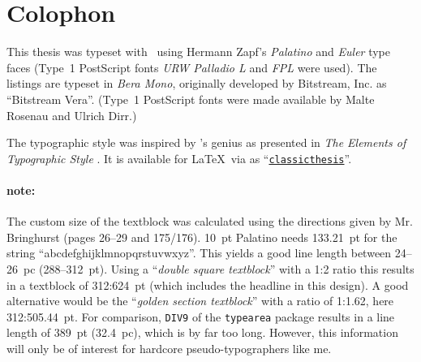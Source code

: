 \pagestyle{empty}

\hfill

\vfill


\section*{Colophon}
This thesis was typeset with \LaTeXe\ using Hermann Zapf's \emph{Palatino} and \emph{Euler} type faces (Type~1 PostScript fonts \emph{URW Palladio L} and \emph{FPL} were used). The listings are typeset in \emph{Bera Mono}, originally developed by Bitstream, Inc. as ``Bitstream Vera''. (Type~1 PostScript fonts were made available by Malte Rosenau and Ulrich Dirr.)

The typographic style was inspired by 's genius as presented in \emph{The Elements of Typographic Style} \citep{bringhurst:2002}. It is available for \LaTeX\ via  as ``\href{http://www.ctan.org/tex-archive/macros/latex/contrib/classicthesis/}{\texttt{classicthesis}}''.

\paragraph{note:} The custom size of the textblock was calculated using the directions given by Mr. Bringhurst (pages 26--29 and 175/176). 10~pt Palatino needs  133.21~pt for the string ``abcdefghijklmnopqrstuvwxyz''. This yields a good line length between 24--26~pc (288--312~pt). Using a ``\emph{double square textblock}'' with a 1:2 ratio this results in a textblock of 312:624~pt (which includes the headline in this design). A good alternative would be the ``\emph{golden section textblock}'' with a ratio of 1:1.62, here 312:505.44~pt. For comparison, \texttt{DIV9} of the \texttt{typearea} package results in a line length of 389~pt (32.4~pc), which is by far too long. However, this information will only be of interest for hardcore pseudo-typographers like me.

%

\bigskip

\noindent\finalVersionString